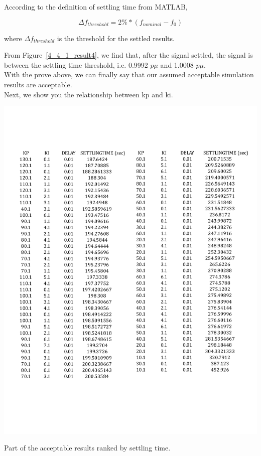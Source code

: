 According to the definition of settling time from MATLAB,

\begin{equation}
    \Delta f_{threshold} = 2\% * (f_{nominal} - f_0)
\end{equation}

where $\Delta f_{threshold}$ is the threshold for the settled results.

From Figure~\ref{4_4_1_result4}, we find that, after the signal settled, the signal is between the settling time threshold, i.e. 0.9992 $p\mu$ and 1.0008 $p\mu$.\\


With the prove above, we can finally say that our assumed acceptable simulation results are acceptable.\\

Next, we show you the relationship between kp and ki. 

\begin{table}[htbp]
\centering
\includegraphics[width = \textwidth]{figure/4_4_1_table.pdf}
\caption{Part of the acceptable results ranked by settling time.}
\label{4_4_1_table}
\end{table}

